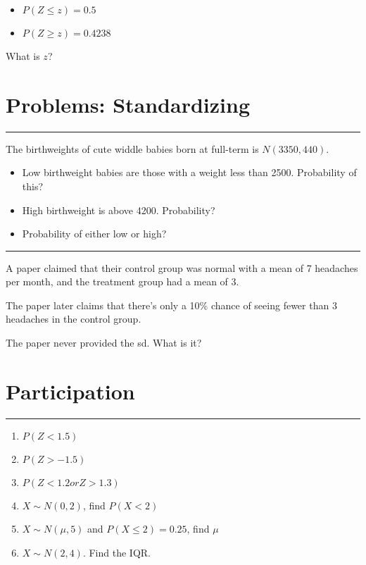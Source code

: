 \documentclass[
  letterpaper,
  DIV=11,
  numbers=noendperiod]{scrreprt}
\providecommand{\tightlist}{%
  \setlength{\itemsep}{0pt}\setlength{\parskip}{0pt}}\usepackage{longtable,booktabs,array}
\begin{document}
\begin{itemize}
\tightlist
\item
  \(P(Z \le z) = 0.5\)
\item
  \(P(Z \ge z) = 0.4238\)
\end{itemize}

What is \(z\)?

\hypertarget{problems-standardizing}{%
\section{Problems: Standardizing}\label{problems-standardizing}}

\begin{center}\rule{0.5\linewidth}{0.5pt}\end{center}

The birthweights of cute widdle babies born at full-term is
\(N(3350, 440)\).

\begin{itemize}
\tightlist
\item
  Low birthweight babies are those with a weight less than 2500.
  Probability of this?
\item
  High birthweight is above 4200. Probability?
\item
  Probability of either low or high?
\end{itemize}

\begin{center}\rule{0.5\linewidth}{0.5pt}\end{center}

A paper claimed that their control group was normal with a mean of 7
headaches per month, and the treatment group had a mean of 3.

The paper later claims that there's only a 10\% chance of seeing fewer
than 3 headaches in the control group.

The paper never provided the sd. What is it?

\hypertarget{participation}{%
\section{Participation}\label{participation}}

\begin{center}\rule{0.5\linewidth}{0.5pt}\end{center}

\begin{enumerate}
\def\labelenumi{\arabic{enumi}.}
\tightlist
\item
  \(P(Z < 1.5)\)
\item
  \(P(Z > -1.5)\)
\item
  \(P(Z < 1.2 or Z > 1.3)\)
\item
  \(X\sim N(0,2)\), find \(P(X < 2)\)
\item
  \(X\sim N(\mu, 5)\) and \(P(X \le 2) = 0.25\), find \(\mu\)
\item
  \(X \sim N(2, 4)\). Find the IQR.
\end{enumerate}
\end{document}
